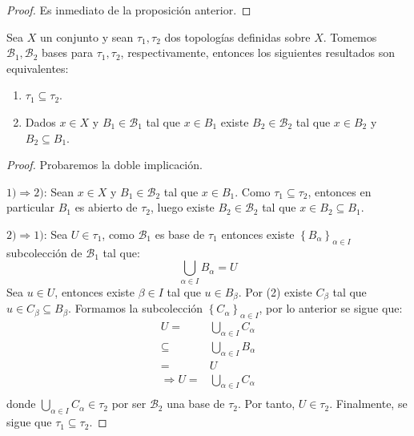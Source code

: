 \documentclass[12pt]{report}
\theoremstyle{largebreak}
\begin{document}
    \begin{proof}
        Es inmediato de la proposición anterior.
    \end{proof}

    \begin{cor}
        Sea $X$ un conjunto y sean $\tau_1,\tau_2$ dos topologías definidas sobre $X$. Tomemos $\mathcal{B}_1,\mathcal{B}_2$ bases para $\tau_1,\tau_2$, respectivamente, entonces los siguientes resultados son equivalentes:
        \begin{enumerate}
            \item $\tau_1\subseteq\tau_2$.
            \item Dados $x\in X$ y $B_1\in\mathcal{B}_1$ tal que $x\in B_1$ existe $B_2\in\mathcal{B}_2$ tal que $x\in B_2$ y $B_2\subseteq B_1$.
        \end{enumerate}
    \end{cor}

    \begin{proof}
        Probaremos la doble implicación.
        
        $1) \Rightarrow 2)$: Sean $x\in X$ y $B_1\in\mathcal{B_2}$ tal que $x\in B_1$. Como $\tau_1\subseteq\tau_2$, entonces en particular $B_1$ es abierto de $\tau_2$, luego existe $B_2\in\mathcal{B}_2$ tal que $x\in B_2\subseteq B_1$.

        $2) \Rightarrow 1)$: Sea $U\in\tau_1$, como $\mathcal{B}_1$ es base de $\tau_1$ entonces existe $\left\{B_\alpha \right\}_{\alpha\in I}$ subcolección de $\mathcal{B}_1$ tal que:
        \begin{equation*}
            \bigcup_{\alpha\in I}B_\alpha=U
        \end{equation*}
        Sea $u\in U$, entonces existe $\beta\in I$ tal que $u\in B_\beta$. Por (2) existe $C_\beta$ tal que $u\in C_\beta\subseteq B_\beta$. Formamos la subcolección $\left\{C_\alpha \right\}_{\alpha\in I}$, por lo anterior se sigue que:
        \begin{equation*}
            \begin{split}
                U=&\bigcup_{\alpha\in I}C_\alpha\\
                \subseteq&\bigcup_{\alpha\in I}B_\alpha\\
                =&U\\
                \Rightarrow U =&\bigcup_{\alpha\in I}C_\alpha\\
            \end{split}
        \end{equation*}
        donde $\bigcup_{\alpha\in I}C_\alpha\in\tau_2$ por ser $\mathcal{B}_2$ una base de $\tau_2$. Por tanto, $U\in\tau_2$. Finalmente, se sigue que $\tau_1\subseteq\tau_2$.

    \end{proof}
\end{document}
